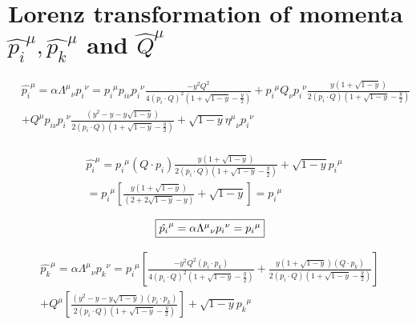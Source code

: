 \section*{Lorenz transformation of momenta $ {\hat{{p_i}}}^{\mu}, {\hat{{p_k}}}^{\mu} $ and $ {\hat{{Q}}}^{\mu} $}
\begin{equation*}
\begin{split}
&{\hat{{p_i}}}^{\mu}=\alpha{\Lambda^{\mu}}_{\nu} {p_i}^{\nu}= {p_i}^{\mu} p_{i\nu}{p_i}^{\nu} \frac{-y^2 Q^2}{4(p_i\cdot Q)^2(1+\sqrt{1-y}-\frac{y}{2})}
	+{p_i}^{\mu} Q_{\nu}{p_i}^{\nu} \frac{y(1+\sqrt{1-y})}{2(p_i\cdot Q)(1+\sqrt{1-y}-\frac{y}{2})}\\
&+{Q}^{\mu} p_{i\nu}{p_i}^{\nu} \frac{(y^2 -y-y\sqrt{1-y})}{2(p_i\cdot Q)(1+\sqrt{1-y}-\frac{y}{2})}+\sqrt{1-y} {\eta^{\mu}}_{\nu}{p_i}^{\nu}\\
\end{split}
\end{equation*}

\begin{equation*}
\begin{split}
&{\hat{{p_i}}}^{\mu}={p_i}^{\mu} (Q\cdot p_i) \frac{y(1+\sqrt{1-y})}{2(p_i\cdot Q)(1+\sqrt{1-y}-\frac{y}{2})}+\sqrt{1-y} {p_i}^{\mu}\\
&={p_i}^{\mu} [ \frac{y(1+\sqrt{1-y})}{(2+2\sqrt{1-y}-y)}+\sqrt{1-y}]={p_i}^{\mu}
    \end{split}
\end{equation*}

\begin{equation}
	\begin{aligned}
		\fbox{$  {\hat{{p_i}}}^{\mu}=\alpha{\Lambda^{\mu}}_{\nu} {p_i}^{\nu}= {p_i}^{\mu}$}
    \end{aligned}
\end{equation}


\begin{equation*}
	\begin{aligned}
	{\hat{{p_k}}}^{\mu}=\alpha{\Lambda^{\mu}}_{\nu} {p_k}^{\nu}= {p_i}^{\mu}[  \frac{-y^2 Q^2 (p_{i}\cdot {p_k})}{4(p_i\cdot Q)^2(1+\sqrt{1-y}-\frac{y}{2})}+ \frac{y(1+\sqrt{1-y})(Q \cdot {p_k})}{2(p_i\cdot Q)(1+\sqrt{1-y}-\frac{y}{2})}]\\
	+{Q}^{\mu} [ \frac{(y^2 -y-y\sqrt{1-y}) (p_{i}\cdot {p_k})}{2(p_i\cdot Q)(1+\sqrt{1-y}-\frac{y}{2})}]
	+\sqrt{1-y} {p_k}^{\mu}\\
    \end{aligned}
\end{equation*}


